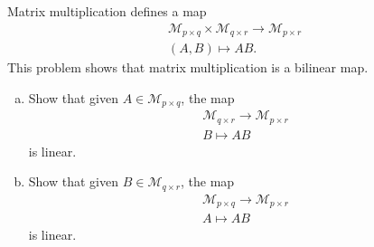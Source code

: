\begin{exercise}
  \label{ex:hw02:matrix-product-bilinearity}
  Matrix multiplication defines a map
  \[
    \begin{gathered}
      \mathcal M_{p\times q}\times\mathcal M_{q\times r}
        \longrightarrow\mathcal M_{p\times r}\\
      (A,B)\longmapsto AB.
    \end{gathered}
  \]
  This problem shows that matrix multiplication is a bilinear map.
  \begin{enumerate}[(a)][2]
    \item Show that given \(A\in\mathcal M_{p\times q}\), the map
      \[
        \begin{gathered}
          \mathcal M_{q\times r}\longrightarrow\mathcal M_{p\times r}\\
          B\longmapsto AB
        \end{gathered}
      \]
      is linear.
    \item Show that given \(B\in\mathcal M_{q\times r}\), the map
      \[
        \begin{gathered}
          \mathcal M_{p\times q}\longrightarrow\mathcal M_{p\times r}\\
          A\longmapsto AB
        \end{gathered}
      \]
      is linear.
  \end{enumerate}
\end{exercise}
